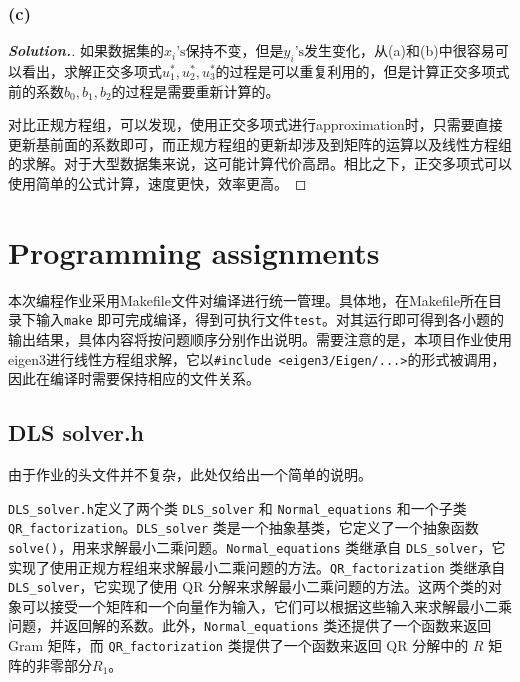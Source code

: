 \documentclass{ctexart}
\begin{document}
\begin{sloppypar}
\subsubsection*{(c)}
\begin{proof}[\textbf{Solution.}]
如果数据集的$x_i\mathrm{’s}$保持不变，但是$y_i\mathrm{’s}$发生变化，从(a)和(b)中很容易可以看出，求解正交多项式$u_1^*,u_2^*,u_3^*$的过程是可以重复利用的，但是计算正交多项式前的系数$b_0,b_1,b_2$的过程是需要重新计算的。

对比正规方程组，可以发现，使用正交多项式进行approximation时，只需要直接更新基前面的系数即可，而正规方程组的更新却涉及到矩阵的运算以及线性方程组的求解。对于大型数据集来说，这可能计算代价高昂。相比之下，正交多项式可以使用简单的公式计算，速度更快，效率更高。
\end{proof}



\section*{Programming assignments}
本次编程作业采用Makefile文件对编译进行统一管理。具体地，在Makefile所在目录下输入\verb|make|
即可完成编译，得到可执行文件\verb|test|。对其运行即可得到各小题的输出结果，具体内容将按问题顺序分别作出说明。需要注意的是，本项目作业使用eigen3进行线性方程组求解，它以\verb|#include <eigen3/Eigen/...>|的形式被调用，因此在编译时需要保持相应的文件关系。
\subsection*{DLS solver.h}
由于作业的头文件并不复杂，此处仅给出一个简单的说明。

\verb|DLS_solver.h|定义了两个类 \verb|DLS_solver| 和 \verb|Normal_equations| 和一个子类 \verb|QR_factorization|。\verb|DLS_solver| 类是一个抽象基类，它定义了一个抽象函数 \verb|solve()|，用来求解最小二乘问题。\verb|Normal_equations| 类继承自 \verb|DLS_solver|，它实现了使用正规方程组来求解最小二乘问题的方法。\verb|QR_factorization| 类继承自 \verb|DLS_solver|，它实现了使用 QR 分解来求解最小二乘问题的方法。这两个类的对象可以接受一个矩阵和一个向量作为输入，它们可以根据这些输入来求解最小二乘问题，并返回解的系数。此外，\verb|Normal_equations| 类还提供了一个函数来返回 Gram 矩阵，而 \verb|QR_factorization| 类提供了一个函数来返回 QR 分解中的 $R$ 矩阵的非零部分$R_1$。

\end{sloppypar}
\end{document}
